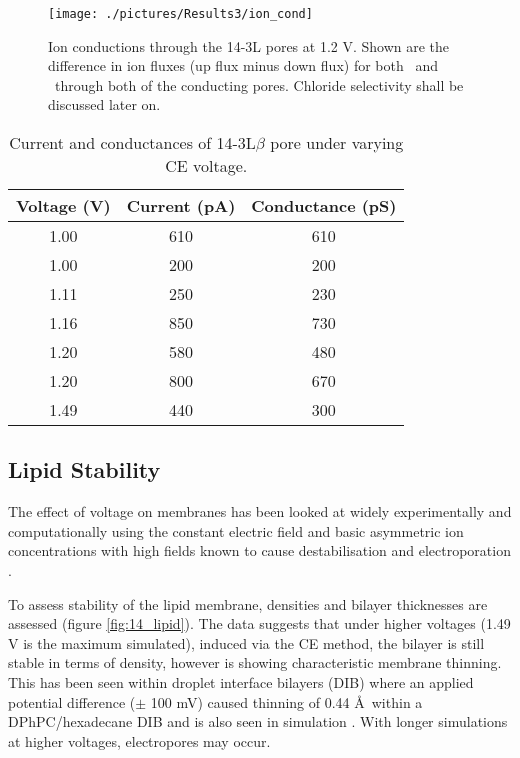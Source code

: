 \begin{figure}[H]
\begin{center}
\texttt{[image: ./pictures/Results3/ion\_cond]}
\caption[Ion conductions through the 14-3L pores at 1.2 V.] {Ion conductions through the 14-3L pores at 1.2 V. Shown are the difference in ion fluxes (up flux minus down flux) for both \Na\ and \Cl\ through both of the conducting pores. Chloride selectivity shall be discussed later on.}
\label{fig:ion_cond}
\end{center}
\end{figure}

\begin{table}[H]
\centering %
\begin{tabular}{ |c|c|c| } 
 \hline
 Voltage (V) & Current (pA) & Conductance (pS) \\  
 \hline
 1.00 & 610 & 610 \\
 1.00 & 200 & 200 \\
 1.11 & 250 & 230 \\
 1.16 & 850 & 730 \\
 1.20 & 580 & 480 \\
 1.20 & 800 & 670 \\
 1.49 & 440 & 300 \\
 \hline
 \end{tabular}
\caption{Current and conductances of 14-3L$\beta$ pore under varying CE voltage.} 
\label{table:14conduct}
\end{table}

\subsection*{Lipid Stability}

The effect of voltage on membranes has been looked at widely experimentally and computationally using the constant electric field \cite{Abiror1979,Gumbart2012,Tieleman2004,Ziegler2008a} and basic asymmetric ion concentrations \cite{Vernier2006a} with high fields known to cause destabilisation and electroporation  \cite{Chernomordik1983,Nuccitelli2006,Weaver1981}. 

To assess stability of the lipid membrane, densities and bilayer thicknesses are assessed (figure \ref{fig:14_lipid}). The data suggests that under higher voltages  (1.49 V is the maximum simulated), induced via the CE method, the bilayer is still stable in terms of density, however is showing characteristic membrane thinning. This has been seen within droplet interface bilayers (DIB) where an applied potential difference ($\pm$ 100 mV) caused thinning of 0.44 \AA\ within a DPhPC/hexadecane DIB \cite{Gross2011a} and is also seen in simulation \cite{Hu2013c}. With longer simulations at higher voltages, electropores may occur.

